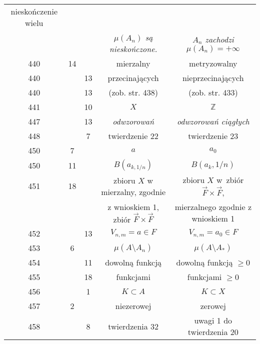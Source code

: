 \documentclass[a4paper,11pt]{article}
\begin{document}
\begin{center}
\begin{tabular}{|c|c|c|c|c|}
{                                          nieskończenie wielu} \\
    & & & \emph{$\mu( A_{ n } )$ są nieskończone.}
           & \emph{$A_{ n }$ zachodzi $\mu( A_{ n } ) = +\infty$} \\
    440 & 14 & & mierzalny & metryzowalny \\
    440 & & 13 & przecinających & nieprzecinających \\
    440 & & 13 & (zob. str. 438) & (zob. str. 433) \\
    441 & & 10 & $X$ & $\mathbb{Z}$ \\
    447 & & 13 & \emph{odwzorowań} & \emph{odwzorowań ciągłych} \\
    448 & &  7 & twierdzenie 22 & twierdzenie 23 \\
    450 &  7 & & $a$ & $a_{ 0 }$ \\
    450 & 11 & & $B( a_{ k, 1/n } )$ & $B( a_{ k }, 1/n )$ \\
    451 & 18 & & zbioru $X$ w mierzalny, zgodnie
           & zbioru $X$ w~zbiór $\vec{ F } \times \vec{ F }$, \\
    & & & z wnioskiem 1, zbiór $\vec{ F } \times \vec{ F }$
           & mierzalnego zgodnie z wnioskiem 1 \\
    452 & & 13 & $V_{ n, m } = a \in F$ & $V_{ n, m } = a_{ 0 } \in F$ \\
    453 &  6 & & $\mu( A \setminus A_{ n } )$
           & $\mu( A \setminus A_{ * } )$ \\
    454 & & 11 & dowolną funkcją & dowolną funkcją $\geq 0$ \\
    455 & & 18 & funkcjami & funkcjami $\geq 0$ \\
    456 & &  1 & $K \subset A$ & $K \subset X$ \\
    457 &  2 & & niezerowej & zerowej \\
    458 & &  8 & twierdzenia 32 & uwagi 1 do twierdzenia 20 \\
    \hline
  \end{tabular}


\end{center}
\end{document}
